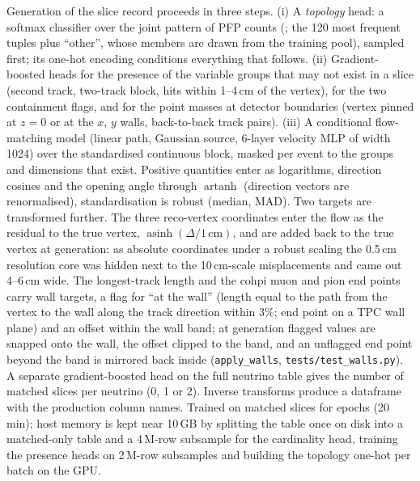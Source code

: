 \documentclass[11pt]{article}
\begin{document}
Generation of the slice record proceeds in three steps. (i) A \emph{topology} head: a softmax classifier over
the joint pattern of PFP counts (; the 120 most frequent
tuples plus ``other'', whose members are drawn from the training pool), sampled first; its one-hot encoding
conditions everything that follows. (ii) Gradient-boosted heads for the presence of the variable groups that may
not exist in a slice (second track, two-track block, hits within 1--4\,cm of the vertex), for the two containment
flags, and for the point masses at detector boundaries (vertex pinned at $z=0$ or at the $x$, $y$ walls,
back-to-back track pairs). (iii) A conditional flow-matching model (linear path, Gaussian source, 6-layer velocity
MLP of width 1024) over the standardised continuous block, masked per event to the groups and dimensions that
exist. Positive quantities enter as logarithms, direction cosines and the opening angle through
$\operatorname{artanh}$ (direction vectors are renormalised), standardisation is robust (median, MAD). Two
targets are transformed further. The three reco-vertex coordinates enter the flow as the residual to the true
vertex, $\operatorname{asinh}(\Delta/1\,\mathrm{cm})$, and are added back to the true vertex at generation: as
absolute coordinates under a robust scaling the 0.5\,cm resolution core was hidden next to the 10\,cm-scale
misplacements and came out 4--6\,cm wide. The longest-track length and the cohpi muon and pion end points carry
wall targets, a flag for ``at the wall'' (length equal to the path from the vertex to the wall along the track
direction within 3\%; end point on a TPC wall plane) and an offset within the wall band; at generation flagged
values are snapped onto the wall, the offset clipped to the band, and an unflagged end point beyond the band is
mirrored back inside (\texttt{apply\_walls}, \texttt{tests/test\_walls.py}). A separate gradient-boosted head on
the full neutrino table gives the number of matched slices per neutrino (0, 1 or 2). Inverse transforms produce
a dataframe with the production column names. Trained on \mTwoMatched{} matched slices for \mTwoEpochs{} epochs
(20\,min); host memory is kept near 10\,GB by splitting the table once on disk into a matched-only table and a
4\,M-row subsample for the cardinality head, training the presence heads on 2\,M-row subsamples and building the
topology one-hot per batch on the GPU.
\end{document}
